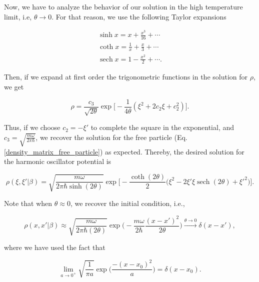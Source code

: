 \documentclass{article}
\DeclareMathOperator{\sech}{sech}
\begin{document}
Now, we have to analyze the behavior of our solution in the high temperature limit, i.e, $\theta \longrightarrow 0$. For that reason, we use the following Taylor expansions

\begin{equation}
    \begin{split}
        \sinh x = x + \frac{x^{3}}{16} + \cdots \\ \coth x = \frac{1}{x} + \frac{x}{3} + \cdots \\ \sech x = 1 - \frac{x^{2}}{2} + \cdots.
    \end{split}
\end{equation}

Then, if we expand at first order the trigonometric functions in the solution for $\rho$, we get

\begin{equation}
    \rho = \frac{c_{3}}{\sqrt{2\theta}} \exp \big[ -\frac{1}{4\theta}(\xi^{2} + 2c_{2}\xi + c_{2}^{2}) \big].
\end{equation}

Thus, if we choose $c_{2}=-\xi'$ to complete the square in the exponential, and $c_{3} = \sqrt{\frac{m\omega}{2\pi \hbar}}$, we recover the solution for the free particle (Eq. \ref{density_matrix_free_particle}) as expected. Thereby, the desired solution for the harmonic oscillator potential is

\begin{equation}\label{harmonic_osc_density_matrix}
    \rho(\xi, \xi'|\beta) = \sqrt{\frac{m\omega}{2\pi \hbar \sinh(2\theta)}} \exp \Bigg[ -\frac{\coth(2\theta)}{2} \big( \xi^{2} - 2\xi' \xi \sech(2\theta) + \xi'^{2} \big) \Big].
\end{equation}

Note that when $\theta \approx 0$, we recover the initial condition, i.e.,

\begin{equation}
    \rho(x, x' | \beta) \approx \sqrt{\frac{m\omega}{2\pi\hbar (2\theta)}} \exp \bigg(- \frac{m\omega}{2\hbar} \frac{(x-x')^{2}}{2\theta} \bigg) \xrightarrow{\theta \longrightarrow 0} \delta(x-x'),
\end{equation}

where we have used the fact that

\begin{equation}
    \lim_{a \to 0^{+}} \sqrt{\frac{1}{\pi a}} \exp \bigg(\frac{-(x-x_{0})^{2}}{a} \bigg) = \delta(x-x_{0}).
\end{equation}
\end{document}
